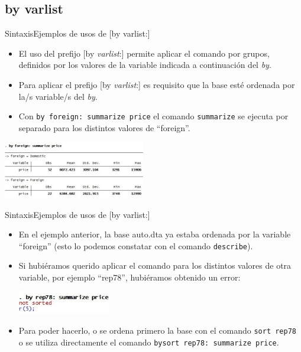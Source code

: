 \documentclass{beamer}
\begin{document}
\subsection{by varlist}

\begin{frame}{Sintaxis}{Ejemplos de usos de [by varlist:]}
\begin{itemize}
\item El uso del prefijo [by \textit{varlist}:] permite aplicar el comando por grupos, definidos por los valores de la variable indicada a continuación del \textit{by}.
\item Para aplicar el prefijo [by \textit{varlist}:] es requisito que la base esté ordenada por la/s variable/s del \textit{by}. 
\item Con \texttt{by foreign: summarize price} el comando \texttt{summarize} se ejecuta por separado para los distintos valores de ``foreign''.
\end{itemize} 
\centerline{\includegraphics[height=2.5cm]{by.jpg}}
\end{frame}

\begin{frame}{Sintaxis}{Ejemplos de usos de [by varlist:]}
\begin{itemize}
\item En el ejemplo anterior, la base auto.dta ya estaba ordenada por la variable ``foreign'' (esto lo podemos constatar con el comando \texttt{describe}).
\item Si hubiéramos querido aplicar el comando para los distintos valores de otra variable, por ejemplo ``rep78'', hubiéramos obtenido un error:\\\medskip
\centerline{\includegraphics[height=1cm]{byrep.jpg}}
\item Para poder hacerlo, o se ordena primero la base con el comando \texttt{sort rep78} o se utiliza directamente el comando \texttt{bysort rep78: summarize price}.
\end{itemize}
\end{frame}
\end{document}

